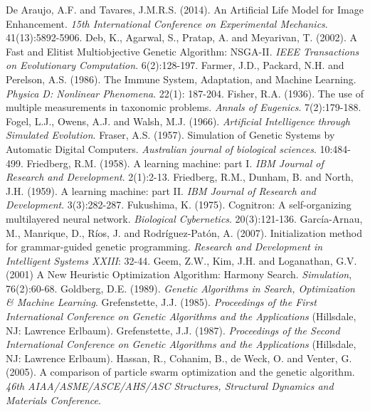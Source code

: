 \documentclass[spanish,a4paper,12pt,twoside]{report}
\begin{document}
\begin{thebibliography}{00}
   De Araujo, A.F. and Tavares, J.M.R.S. (2014). An Artificial Life Model for Image Enhancement. \emph{15th International Conference on Experimental Mechanics}. 41(13):5892-5906.
   Deb, K., Agarwal, S., Pratap, A. and Meyarivan, T. (2002). A Fast and Elitist Multiobjective Genetic Algorithm: NSGA-II. \emph{IEEE Transactions on Evolutionary Computation}. 6(2):128-197.
   Farmer, J.D., Packard, N.H. and Perelson, A.S. (1986). The Immune System, Adaptation, and Machine Learning. \emph{Physica D: Nonlinear Phenomena}. 22(1): 187-204.
   Fisher, R.A. (1936). The use of multiple measurements in taxonomic problems. \emph{Annals of Eugenics}. 7(2):179-188.
   Fogel, L.J., Owens, A.J. and Walsh, M.J. (1966). \emph{Artificial Intelligence through Simulated Evolution}.
   Fraser, A.S. (1957). Simulation of Genetic Systems by Automatic Digital Computers. \emph{Australian journal of biological sciences}. 10:484-499.
   Friedberg, R.M. (1958). A learning machine: part I. \emph{IBM Journal of Research and Development}. 2(1):2-13.
   Friedberg, R.M., Dunham, B. and North, J.H. (1959). A learning machine: part II. \emph{IBM Journal of Research and Development}. 3(3):282-287.
   Fukushima, K. (1975). Cognitron: A self-organizing multilayered neural network. \emph{Biological Cybernetics}. 20(3):121-136.
   García-Arnau, M., Manrique, D., Ríos, J. and Rodríguez-Patón, A. (2007). Initialization method for grammar-guided genetic programming. \emph{Research and Development in Intelligent Systems XXIII}: 32-44.
   Geem, Z.W., Kim, J.H. and Loganathan, G.V. (2001) A New Heuristic Optimization Algorithm: Harmony Search. \emph{Simulation}, 76(2):60-68.
   Goldberg, D.E. (1989). \emph{Genetic Algorithms in Search, Optimization \& Machine Learning}.
   Grefenstette, J.J. (1985). \emph{Proceedings of the First International Conference on Genetic Algorithms and the Applications} (Hillsdale, NJ: Lawrence Erlbaum).
   Grefenstette, J.J. (1987). \emph{Proceedings of the Second International Conference on Genetic Algorithms and the Applications} (Hillsdale, NJ: Lawrence Erlbaum).
   Hassan, R., Cohanim, B., de Weck, O. and Venter, G. (2005). A comparison of particle swarm optimization and the genetic algorithm. \emph{46th AIAA/ASME/ASCE/AHS/ASC Structures, Structural Dynamics and Materials Conference}.

\end{thebibliography}
\end{document}
